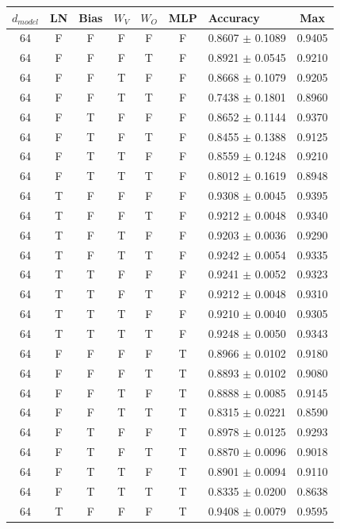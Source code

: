 \begin{tabular}{c c c c c c l c}
\toprule
$d_{model}$ & LN & Bias & $W_V$ & $W_O$ & MLP & Accuracy & Max \\
\midrule
64 & F & F & F & F & F & 0.8607 $\pm$ 0.1089 & 0.9405 \\
\midrule
64 & F & F & F & T & F & 0.8921 $\pm$ 0.0545 & 0.9210 \\
64 & F & F & T & F & F & 0.8668 $\pm$ 0.1079 & 0.9205 \\
64 & F & F & T & T & F & 0.7438 $\pm$ 0.1801 & 0.8960 \\
64 & F & T & F & F & F & 0.8652 $\pm$ 0.1144 & 0.9370 \\
64 & F & T & F & T & F & 0.8455 $\pm$ 0.1388 & 0.9125 \\
64 & F & T & T & F & F & 0.8559 $\pm$ 0.1248 & 0.9210 \\
64 & F & T & T & T & F & 0.8012 $\pm$ 0.1619 & 0.8948 \\
64 & T & F & F & F & F & 0.9308 $\pm$ 0.0045 & 0.9395 \\
64 & T & F & F & T & F & 0.9212 $\pm$ 0.0048 & 0.9340 \\
64 & T & F & T & F & F & 0.9203 $\pm$ 0.0036 & 0.9290 \\
64 & T & F & T & T & F & 0.9242 $\pm$ 0.0054 & 0.9335 \\
64 & T & T & F & F & F & 0.9241 $\pm$ 0.0052 & 0.9323 \\
64 & T & T & F & T & F & 0.9212 $\pm$ 0.0048 & 0.9310 \\
64 & T & T & T & F & F & 0.9210 $\pm$ 0.0040 & 0.9305 \\
64 & T & T & T & T & F & 0.9248 $\pm$ 0.0050 & 0.9343 \\
64 & F & F & F & F & T & 0.8966 $\pm$ 0.0102 & 0.9180 \\
64 & F & F & F & T & T & 0.8893 $\pm$ 0.0102 & 0.9080 \\
64 & F & F & T & F & T & 0.8888 $\pm$ 0.0085 & 0.9145 \\
64 & F & F & T & T & T & 0.8315 $\pm$ 0.0221 & 0.8590 \\
64 & F & T & F & F & T & 0.8978 $\pm$ 0.0125 & 0.9293 \\
64 & F & T & F & T & T & 0.8870 $\pm$ 0.0096 & 0.9018 \\
64 & F & T & T & F & T & 0.8901 $\pm$ 0.0094 & 0.9110 \\
64 & F & T & T & T & T & 0.8335 $\pm$ 0.0200 & 0.8638 \\
64 & T & F & F & F & T & 0.9408 $\pm$ 0.0079 & 0.9595 \\

\end{tabular}
